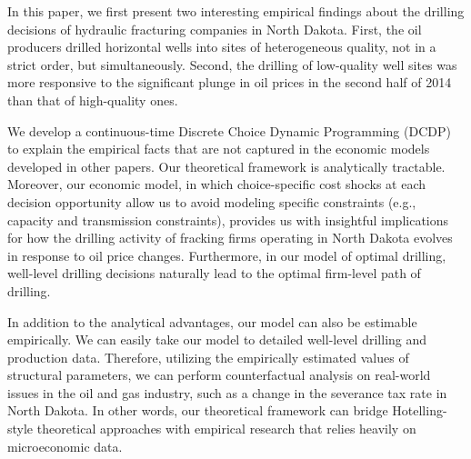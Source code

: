 In this paper, we first present two interesting empirical findings about the drilling decisions of hydraulic fracturing companies in North Dakota. First, the oil producers drilled horizontal wells into sites of heterogeneous quality, not in a strict order, but simultaneously. Second, the drilling of low-quality well sites was more responsive to the significant plunge in oil prices in the second half of 2014 than that of high-quality ones. 

We develop a continuous-time Discrete Choice Dynamic Programming (DCDP) to explain the empirical facts that are not captured in the economic models developed in other papers. Our theoretical framework is analytically tractable. Moreover, our economic model, in which choice-specific cost shocks at each decision opportunity allow us to avoid modeling specific constraints (e.g., capacity and transmission constraints), provides us with insightful implications for how the drilling activity of fracking firms operating in North Dakota evolves in response to oil price changes. Furthermore, in our model of optimal drilling, well-level drilling decisions naturally lead to the optimal firm-level path of drilling. 

In addition to the analytical advantages, our model can also be estimable empirically. We can easily take our model to detailed well-level drilling and production data. Therefore, utilizing the empirically estimated values of structural parameters, we can perform counterfactual analysis on real-world issues in the oil and gas industry, such as a change in the severance tax rate in North Dakota. In other words, our theoretical framework can bridge Hotelling-style theoretical approaches with empirical research that relies heavily on microeconomic data. 
